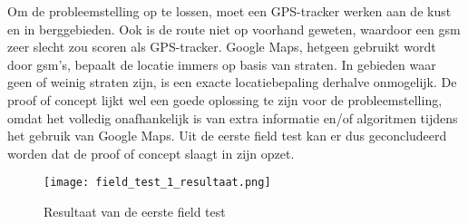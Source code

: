 Om de probleemstelling op te lossen, moet een GPS-tracker werken aan de kust en in berggebieden. Ook is de route niet op voorhand geweten, waardoor een gsm zeer slecht zou scoren als GPS-tracker. Google Maps, hetgeen gebruikt wordt door gsm's, bepaalt de locatie immers op basis van straten. In gebieden waar geen of weinig straten zijn, is een exacte locatiebepaling derhalve onmogelijk. De proof of concept lijkt wel een goede oplossing te zijn voor de probleemstelling, omdat het volledig onafhankelijk is van extra informatie en/of algoritmen tijdens het gebruik van Google Maps. 
\newline
Uit de eerste field test kan er dus geconcludeerd worden dat de proof of concept slaagt in zijn opzet.
\begin{figure}
	\texttt{[image: field\_test\_1\_resultaat.png]}
	\caption{Resultaat van de eerste field test}
	\label{fig:field_test_1_resultaat}
\end{figure}
